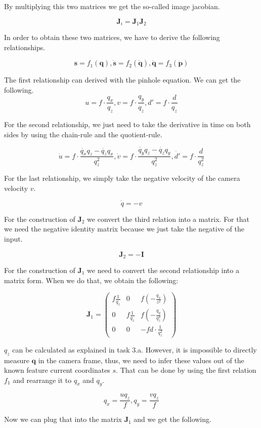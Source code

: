 \documentclass[a4paper,12pt]{article}
\begin{document}
By multiplying this two matrices we get the so-called image jacobian.

\[
\mathbf{J}_i = \mathbf{J}_1 \mathbf{J}_2
\]

In order to obtain these two matrices, we have to derive the following relationships.

\[
\mathbf{s} = f_1(\mathbf{q}),
\dot{\mathbf{s}} = f_2(\dot{\mathbf{q}}),
\dot{\mathbf{q}} = f_3(\dot{\mathbf{p}})
\]

The first relationship can derived with the pinhole equation.
We can get the following.
\[
u = f\cdot \frac{q_x}{q_z},
v = f \cdot \frac{q_y}{q_z},
d' = f \cdot \frac{d}{q_z}
\]

For the second relationship, we just need to take the derivative in time on both sides by using the chain-rule and the quotient-rule.

\[
\dot{u} = f \cdot \frac{\dot{q_x}q_z - \dot{q_z} q_x}{q_z^2}, 
\dot{v}  = f \cdot \frac{\dot{q_y}q_z - \dot{q_z} q_y}{q_z^2},
\dot{d'} = f \cdot \frac{d}{q_z^2}
\]

For the last relationship, we simply take the negative velocity of the camera velocity $v$. 

\[
\dot{q} = -v
\]

For the construction of $\mathbf{J}_2$ we convert the third relation into a matrix. For that we need the negative identity matrix because we just take the negative of the input.

\[
\mathbf{J}_2 = - \mathbf{I}
\]

For the construction of $\mathbf{J}_1$ we need to convert the second relationship into a matrix form. When we do that, we obtain the following:

\[
\mathbf{J}_1 =
\begin{pmatrix}
f \frac{1}{q_z} & 0 & f(-\frac{q_x}{z^2}) \\
0 & f \frac{1}{q_z} & f(-\frac{q_y}{q_z^2}) \\
0 & 0 & -f d \cdot \frac{1}{q_z^2}
\end{pmatrix}
\]

$q_z$ can be calculated as explained in task 3.a. 
However, it is impossible to directly measure $\mathbf{q}$ in the camera frame, thus, we need to infer these values out of the known feature current coordinates $s$. That can be done by using the first relation $f_1$ and rearrange it to $q_x$ and $q_y$.

\[
q_x = \frac{uq_z}{f}, q_y = \frac{vq_z}{f}
\]

Now we can plug that into the matrix $\mathbf{J}_1$ and we get the following.
\end{document}
